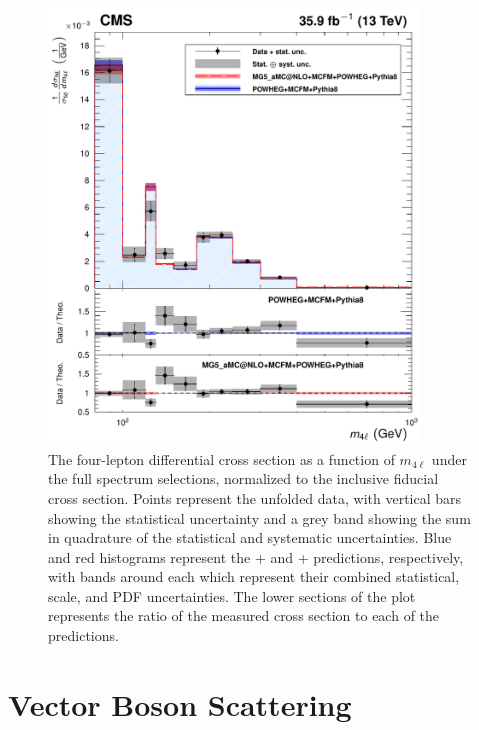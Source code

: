 \begin{figure}[htbp]
  \begin{center}
    \includegraphics[width=0.88\textwidth]{results/unfold_massFull.pdf}
    \caption[Normalized differential four-lepton cross section as a function of four-lepton invariant mass with loosened {\PZ} mass cuts]{
        The four-lepton differential cross section as a function of $m_{4\ell}$ under the full spectrum selections, normalized to the inclusive fiducial cross section.
        Points represent the unfolded data, with vertical bars showing the statistical uncertainty and a grey band showing the sum in quadrature of the statistical and systematic uncertainties.
        Blue and red histograms represent the {\POWHEG}+{\MCFM} and {\MGAMC}+{\MCFM} predictions, respectively, with bands around each which represent their combined statistical, scale, and PDF uncertainties.
        The lower sections of the plot represents the ratio of the measured cross section to each of the predictions.
      }\label{fig:unfold_massFull}
  \end{center}
\end{figure}



\section{Vector Boson Scattering}

